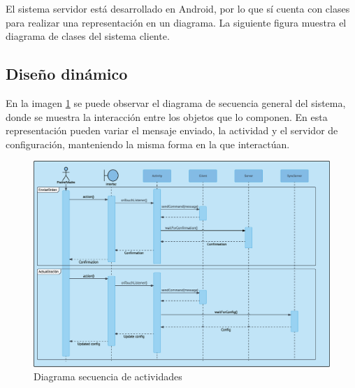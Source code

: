 \documentclass[12pt, twoside]{article}
\begin{document}
        El sistema servidor está desarrollado en Android, por lo que sí cuenta con clases para realizar una representación en un diagrama. La siguiente figura muestra el diagrama de clases del sistema cliente.
        

    \subsection{Diseño dinámico}
    En la imagen \ref{fig:main_activity_sequence_diagram} se puede observar el diagrama de secuencia general del sistema, donde se muestra la interacción entre los objetos que lo componen. En esta representación pueden variar el mensaje enviado, la actividad y el servidor de configuración, manteniendo la misma forma en la que interactúan.

    \cleardoublepage

    \begin{figure}[h!]
    \centering
        \includegraphics[scale=0.32]{main_activity_sequence_diagram.eps}
        \caption{Diagrama secuencia de actividades}
        \label{fig:main_activity_sequence_diagram}
    \end{figure}
\end{document}
